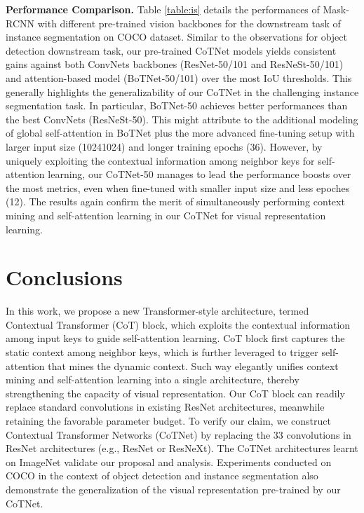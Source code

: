 \documentclass[10pt,twocolumn,letterpaper]{article}
\begin{document}
\textbf{Performance Comparison.}
Table \ref{table:is} details the performances of Mask-RCNN with different pre-trained vision backbones for the downstream task of instance segmentation on COCO dataset. Similar to the observations for object detection downstream task, our pre-trained CoTNet models yields consistent gains against both ConvNets backbones (ResNet-50/101 and ResNeSt-50/101) and attention-based model (BoTNet-50/101) over the most IoU thresholds. This generally highlights the generalizability of our CoTNet in the challenging instance segmentation task. In particular, BoTNet-50 achieves better performances than the best ConvNets (ResNeSt-50). This might attribute to the additional modeling of global self-attention in BoTNet plus the more advanced fine-tuning setup with larger input size (10241024) and longer training epochs (36). However, by uniquely exploiting the contextual information among neighbor keys for self-attention learning, our CoTNet-50 manages to lead the performance boosts over the most metrics, even when fine-tuned with smaller input size and less epoches (12). The results again confirm the merit of simultaneously performing context mining and self-attention learning in our CoTNet for visual representation learning.

\section{Conclusions}

In this work, we propose a new Transformer-style architecture, termed Contextual Transformer (CoT) block, which exploits the contextual information among input keys to guide self-attention learning. CoT block first captures the static context among neighbor keys, which is further leveraged to trigger self-attention that mines the dynamic context. Such way elegantly unifies context mining and self-attention learning into a single architecture, thereby strengthening the capacity of visual representation. Our CoT block can readily replace standard convolutions in existing ResNet architectures, meanwhile retaining the favorable parameter budget. To verify our claim, we construct Contextual Transformer Networks (CoTNet) by replacing the 33 convolutions in ResNet architectures (e.g., ResNet or ResNeXt). The CoTNet architectures learnt on ImageNet validate our proposal and analysis. Experiments conducted on COCO in the context of object detection and instance segmentation also demonstrate the generalization of the visual representation pre-trained by our CoTNet.

{\small


}
\end{document}
